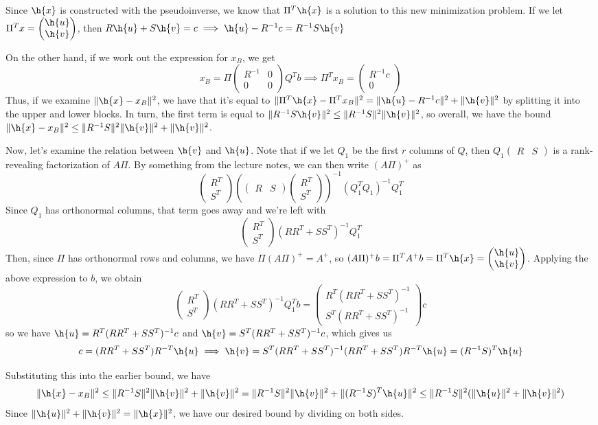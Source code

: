 \documentclass{article}
\newcommand{\openm}{\begin{pmatrix}}
\newcommand{\closem}{\end{pmatrix}}
\begin{document}
Since $\h{x}$ is constructed with the pseudoinverse, we know that $\Pi^T\h{x}$ is a solution to this new minimization problem. If we let $\Pi^Tx=\openm\h{u}\\\h{v}\closem$, then $R\h{u}+S\h{v}=c\implies \h{u}-R^{-1}c=R^{-1}S\h{v}$

On the other hand, if we work out the expression for $x_B$, we get 
\[x_B=\Pi\openm R^{-1}&0\\0&0\closem Q^Tb\implies\Pi^Tx_B=\openm R^{-1}c\\0\closem\]
Thus, if we examine $\|\h{x}-x_B\|^2$, we have that it's equal to $\|\Pi^T\h{x}-\Pi^Tx_B\|^2=\|\h{u}-R^{-1}c\|^2+\|\h{v}\|^2$ by splitting it into the upper and lower blocks. In turn, the first term is equal to $\|R^{-1}S\h{v}\|^2\leq\|R^{-1}S\|^2\|\h{v}\|^2$, so overall, we have the bound $\|\h{x}-x_B\|^2\leq\|R^{-1}S\|^2\|\h{v}\|^2+\|\h{v}\|^2$.

Now, let's examine the relation between $\h{v}$ and $\h{u}$. Note that if we let $Q_1$ be the first $r$ columns of $Q$, then $Q_1\openm R&S\closem$ is a rank-revealing factorization of $A\Pi$. By something from the lecture notes, we can then write $(A\Pi)^+$ as 
\[\openm R^T\\S^T\closem\left(\openm R&S\closem\openm R^T\\S^T\closem\right)^{-1}(Q_1^TQ_1)^{-1}Q_1^T\]
Since $Q_1$ has orthonormal columns, that term goes away and we're left with
\[\openm R^T\\S^T\closem(RR^T+SS^T)^{-1}Q_1^T\]
Then, since $\Pi$ has orthonormal rows and columns, we have $\Pi(A\Pi)^+=A^+$, so $(A\Pi)^+b=\Pi^TA^+b=\Pi^T\h{x}=\openm\h{u}\\\h{v}\closem$. Applying the above expression to $b$, we obtain
\[\openm R^T\\S^T\closem(RR^T+SS^T)^{-1}Q_1^Tb=\openm R^T(RR^T+SS^T)^{-1}\\S^T(RR^T+SS^T)^{-1}\closem c\]
so we have $\h{u}=R^T(RR^T+SS^T)^{-1}c$ and $\h{v}=S^T(RR^T+SS^T)^{-1}c$, which gives us
\[c=(RR^T+SS^T)R^{-T}\h{u}\implies\h{v}=S^T(RR^T+SS^T)^{-1}(RR^T+SS^T)R^{-T}\h{u}=(R^{-1}S)^T\h{u}\]

Substituting this into the earlier bound, we have 
\[\|\h{x}-x_B\|^2\leq\|R^{-1}S\|^2\|\h{v}\|^2+\|\h{v}\|^2=\|R^{-1}S\|^2\|\h{v}\|^2+\|(R^{-1}S)^T\h{u}\|^2\leq\|R^{-1}S\|^2(\|\h{u}\|^2+\|\h{v}\|^2)\]
Since $\|\h{u}\|^2+\|\h{v}\|^2=\|\h{x}\|^2$, we have our desired bound by dividing on both sides.
\end{document}

